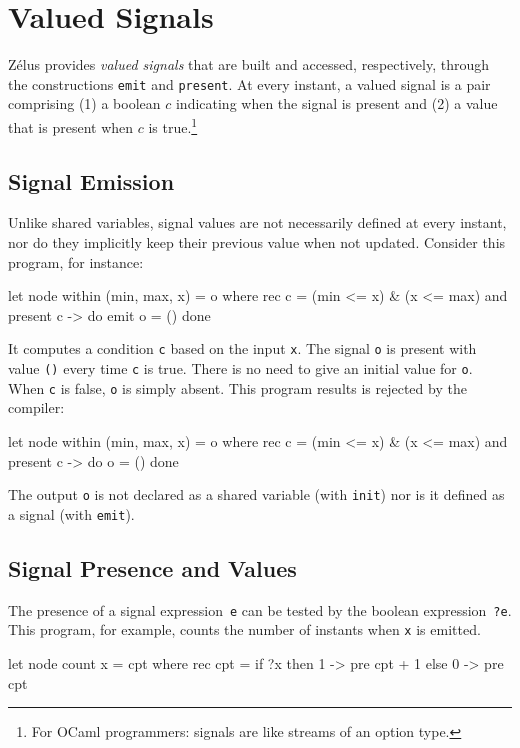 \documentclass[11pt,titlepage,twoside]{report}
\makeatletter
\newcommand{\zls}[1]{{\@span{class="zelusinline"}#1}}
\newcommand{\zls}[1]{\texttt{#1}}
\renewcommand{\zls}[1]{\texttt{#1}}
\newcommand{\zelus}{{\sf Z\'elus}}
\newcommand{\ocaml}{{\sf OCaml}}
\makeatother
\begin{document}
\section{Valued Signals\label{signals}} %

\zelus{} provides \emph{valued signals} that are built and accessed, 
respectively, through the constructions \zls{emit} and \zls{present}.
At every instant, a valued signal is a pair comprising (1) a boolean
$c$ indicating when the signal is present and (2) a value that is present 
when $c$ is true.\footnote{For \ocaml{} programmers: signals are like 
streams of an option type.}
 
\subsection{Signal Emission\label{emit}} %

Unlike shared variables, signal values are not necessarily defined at every 
instant, nor do they implicitly keep their previous value when not updated.
Consider this program, for instance:
\begin{chklisting}[withresult]
let node within (min, max, x) = o where
  rec c = (min <= x) & (x <= max)
  and present c -> do emit o = () done
\end{chklisting}
It computes a condition \zls{c} based on the input \zls{x}.
The signal \zls{o} is present with value \zls{()} every time \zls{c} is
true.
There is no need to give an initial value for \zls{o}.
When \zls{c} is false, \zls{o} is simply absent.
This program results is rejected by the compiler:
\begin{chklisting}
let node within (min, max, x) = o where
  rec c = (min <= x) & (x <= max)
  and present c -> do o = () done
\end{chklisting}
The output \zls{o} is not declared as a shared variable (with \zls{init}) 
nor is it defined as a signal (with \zls{emit}).

\subsection{Signal Presence and Values\label{signalpresence}} %

The presence of a signal expression~\zls{e} can be tested by the boolean 
expression~\zls{?e}.
This program, for
example, counts the number of instants when \zls{x} is emitted.
\begin{chklisting}[withresult]
let node count x = cpt where
  rec cpt = if ?x then 1 -> pre cpt + 1 else 0 -> pre cpt
\end{chklisting}
\end{document}
